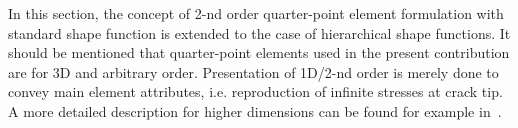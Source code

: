 \documentclass[11pt]{acmeArticle}
\numberwithin{equation}{section}
\begin{document}
In this section, the concept of 2-nd order quarter-point element formulation with standard shape function is extended to the case of hierarchical shape functions.
It should be mentioned that quarter-point elements used in the present contribution are for 3D and arbitrary order.
Presentation of 1D/2-nd order is merely done to convey main element attributes, i.e. reproduction of infinite stresses at crack tip.
A more detailed description for higher dimensions can be found for example in~\citep{nejati2015use}.
\end{document}
